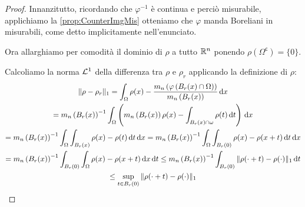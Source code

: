 \begin{proof}
	Innanzitutto, ricordando che $\varphi^{-1}$ è continua e perciò misurabile, applichiamo la \cref{prop:CounterImgMis} otteniamo che $\varphi$ manda Boreliani in misurabili, come detto implicitamente nell'enunciato.
	
	Ora allarghiamo per comodità il dominio di $\rho$ a tutto $\mathbb R^n$ ponendo $\rho(\Omega^{\mathsf{c}})=\{0\}$.
	
	Calcoliamo la norma $\mathcal L^1$ della differenza tra $\rho$ e $\rho_r$ applicando la definizione di $\rho$:
	\newcommand{\C}{\ensuremath{m_n\left(B_r(x)\right)}}
	\begin{multline*}
		\LNorm{\rho-\rho_r}=\int_\Omega \rho(x)-\frac{m_n\left(\varphi\left(B_r(x)\cap \Omega\right)\right)}{\C} \de x\\
		= \C^{-1}\int_\Omega \left(\C\rho(x)-\int_{B_r(x)\cap\omega}\rho(t)\de t\right)\de x\\
		=\C^{-1}\int_\Omega \int_{B_r(x)}\rho(x)-\rho(t)\de t\de x
		=\C^{-1}\int_\Omega \int_{B_r(0)}\rho(x)-\rho(x+t)\de t\de x\\
		=\C^{-1}\int_{B_r(0)}\int_\Omega \rho(x)-\rho(x+t) \de x\de t
		\le \C^{-1}\int_{B_r(0)}\LNorm{\rho(\cdot+t)-\rho(\cdot)}\de t \\
		\le \sup_{t\in B_r(0)} \LNorm{\rho(\cdot+t)-\rho(\cdot)}
	\end{multline*}
\end{proof}

